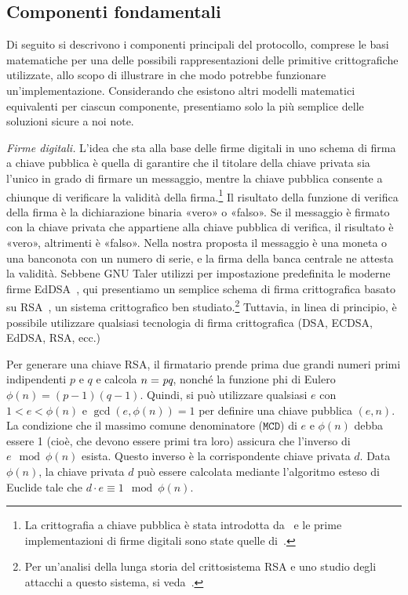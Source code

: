 \documentclass{article}
\begin{document}
\subsection{Componenti fondamentali}\label{componenti-fondamentali}

Di seguito si descrivono i componenti principali del protocollo, comprese 
le basi matematiche per una delle possibili rappresentazioni delle 
primitive crittografiche utilizzate, allo scopo di illustrare in 
che modo potrebbe funzionare un'implementazione. Considerando che 
esistono altri modelli matematici equivalenti per ciascun componente, 
presentiamo solo la più semplice delle soluzioni sicure a noi note.

\emph{Firme digitali.} L'idea che sta alla base delle firme digitali in 
uno schema di firma a chiave pubblica è quella di garantire che il 
titolare della chiave privata sia l'unico in grado di firmare un 
messaggio, mentre la chiave pubblica consente a chiunque di verificare 
la validità della firma.\footnote{La crittografia a chiave pubblica è 
stata introdotta da~\cite{Diffie} e le prime implementazioni di firme 
digitali sono state quelle di~\cite{Rivest}.} Il risultato della funzione 
di verifica della firma è la dichiarazione binaria «vero» o «falso». Se 
il messaggio è firmato con la chiave privata che appartiene alla chiave 
pubblica di verifica, il risultato è «vero», altrimenti è «falso». 
Nella nostra proposta il messaggio è una moneta o una banconota con un 
numero di serie, e la firma della banca centrale ne attesta la 
validità. Sebbene GNU Taler utilizzi per impostazione predefinita le 
moderne firme EdDSA~\cite[vedi][]{Bernstein2012}, qui presentiamo un 
semplice schema di firma crittografica basato su RSA~\cite{Rivest}, un 
sistema crittografico ben studiato.\footnote{Per un'analisi della 
lunga storia del crittosistema RSA e uno studio degli attacchi a questo 
sistema, si veda~\cite{Boneh}.} Tuttavia, in linea di principio, è 
possibile utilizzare qualsiasi tecnologia di firma crittografica 
(DSA, ECDSA, EdDSA, RSA, ecc.)

Per generare una chiave RSA, il firmatario prende prima due grandi 
numeri primi indipendenti $p$ e $q$ e calcola $n = \emph{pq}$, 
nonché la funzione phi di Eulero 
$\phi(n) = (p - 1)(q - 1)$. 
Quindi, si può utilizzare qualsiasi $e$ con $1 < e < \phi(n)$ e 
$\gcd(e, \phi(n)) = 1$ per definire una chiave pubblica $(e,n)$. 
La condizione che il massimo comune denominatore ($\texttt{MCD}$) di $e$ e 
$\phi(n)$ debba essere 1 (cioè, che devono essere 
primi tra loro) assicura che l'inverso di 
$e \mod \phi(n)$ esista. 
Questo inverso è la 
corrispondente chiave privata $d$. Data $\phi(n)$, la chiave 
privata $d$ può essere calcolata mediante l'algoritmo esteso 
di Euclide tale che 
$d \cdot e \equiv 1 \mod \phi(n)$.
\end{document}
